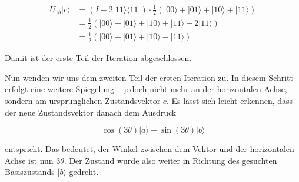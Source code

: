 {\begin{align*}
U_{1b} |c\rangle &= (I - 2|11\rangle \langle 11|) \cdot \frac{1}{2}(|00\rangle + |01\rangle + |10\rangle + |11\rangle) \\
&= \frac{1}{2} \left( |00\rangle + |01\rangle + |10\rangle + |11\rangle - 2|11\rangle \right) \\
&= \frac{1}{2} (|00\rangle + |01\rangle + |10\rangle - |11\rangle)
\end{align*}

Damit ist der erste Teil der Iteration abgeschlossen.

Nun wenden wir uns dem zweiten Teil der ersten Iteration zu. In diesem Schritt erfolgt eine weitere Spiegelung – jedoch nicht mehr an der horizontalen Achse, sondern am ursprünglichen Zustandsvektor $c$. Es lässt sich leicht erkennen, dass der neue Zustandsvektor danach dem Ausdruck

$$
\cos(3\theta)|a\rangle + \sin(3\theta)|b\rangle
$$

\noindent entspricht. Das bedeutet, der Winkel zwischen dem Vektor und der horizontalen Achse ist nun $3\theta$. Der Zustand wurde also weiter in Richtung des gesuchten Basiszustands $|b\rangle$ gedreht.

\begin{figure}[H]
    \centering
{}
\end{figure}}
